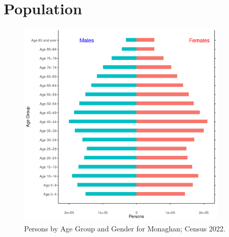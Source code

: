 \documentclass{article}
\begin{document}
\pagebreak

\section{Population} 
\label{sect:Pop}

\begin{figure}[h]
	\centering
	\includegraphics[width = 100mm]{../figures/PyramidPlot.pdf}
	\caption{Persons by Age Group and Gender for Monaghan; Census 2022.}
	\label{fig:2ae19629-1a6a-13a3-e055-000000000001}
	\end{figure}
\end{document}
